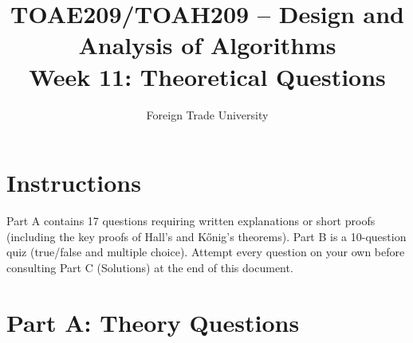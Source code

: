 \documentclass[11pt]{article}
\title{TOAE209/TOAH209 -- Design and Analysis of Algorithms\\[4pt]
\large Week 11: Theoretical Questions}
\author{Foreign Trade University}
\date{}
\begin{document}
\maketitle

\section*{Instructions}

Part A contains 17 questions requiring written explanations or short proofs
(including the key proofs of Hall's and K\H{o}nig's theorems). Part B is a
10-question quiz (true/false and multiple choice). Attempt every question on
your own before consulting Part C (Solutions) at the end of this document.

\section*{Part A: Theory Questions}
\end{document}
